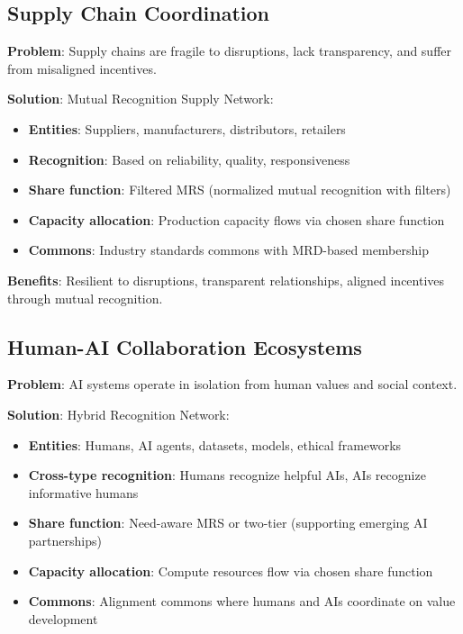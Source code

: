 \documentclass[11pt,a4paper]{article}
\theoremstyle{definition}
\theoremstyle{remark}
\begin{document}
\subsection{Supply Chain Coordination}

\textbf{Problem}: Supply chains are fragile to disruptions, lack transparency, and suffer from misaligned incentives.

\textbf{Solution}: Mutual Recognition Supply Network:
\begin{itemize}
\item \textbf{Entities}: Suppliers, manufacturers, distributors, retailers
\item \textbf{Recognition}: Based on reliability, quality, responsiveness
\item \textbf{Share function}: Filtered MRS (normalized mutual recognition with filters)
\item \textbf{Capacity allocation}: Production capacity flows via chosen share function
\item \textbf{Commons}: Industry standards commons with MRD-based membership
\end{itemize}

\textbf{Benefits}: Resilient to disruptions, transparent relationships, aligned incentives through mutual recognition.

\subsection{Human-AI Collaboration Ecosystems}

\textbf{Problem}: AI systems operate in isolation from human values and social context.

\textbf{Solution}: Hybrid Recognition Network:
\begin{itemize}
\item \textbf{Entities}: Humans, AI agents, datasets, models, ethical frameworks
\item \textbf{Cross-type recognition}: Humans recognize helpful AIs, AIs recognize informative humans
\item \textbf{Share function}: Need-aware MRS or two-tier (supporting emerging AI partnerships)
\item \textbf{Capacity allocation}: Compute resources flow via chosen share function
\item \textbf{Commons}: Alignment commons where humans and AIs coordinate on value development
\end{itemize}
\end{document}
